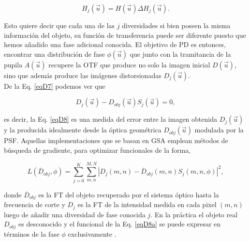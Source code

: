 \begin{equation}
\label{eqD5}
	H_j(\vec{u}) = H(\vec{u})\Delta H_j(\vec{u}).
\end{equation}


Esto quiere decir que cada una de las $j$ diversidades si bien poseen la misma información del objeto, su función de transferencia puede ser diferente puesto que hemos añadido una fase adicional conocida. El objetivo de PD es entonces, encontrar una distribución de fase $\phi (\vec{u})$ que junto con la tramitancia de la pupila $A (\vec{u})$ recupere la OTF que produce no solo la imagen inicial $D(\vec{u})$, sino que además produce las imágenes distorsionadas $D_{j}(\vec{u})$.\\

De la Eq. \ref{eqD7} podemos ver que

\begin{equation}
\label{eqD8}
	D_j(\vec{u}) - D_{obj}(\vec{u}) S_j(\vec{u}) = 0,
\end{equation}

es decir, la Eq. \ref{eqD8} es una medida del error entre la imagen obtenida $D_j(\vec{u})$ y la producida idealmente desde la óptica geométrica $D_{obj}(\vec{u})$ modulada por la PSF. Aquellas implementaciones que se basan en GSA \cite{Paxman1992, Echeverri2015} emplean métodos de búsqueda de gradiente, para optimizar funcionales de la forma,

\begin{equation}
\label{eqD8a}
L(\overline{D}_{obj}, \phi) = \sum\limits_{j=0}^K \sum\limits_{m,n}^{M,N} |D_j(m,n) - \overline{D}_{obj}(m,n) S_j(m,n,\phi)|^2,
\end{equation}

donde $\overline{D}_{obj}$ es la FT del objeto recuperado por el sistema óptico hasta la frecuencia de corte y $D_j$ es la FT de la intensidad medida en cada pixel $(m,n)$ luego de añadir una diversidad de fase conocida $j$. En la práctica el objeto real $D_{obj}$ es desconocido y el funcional de la Eq. \ref{eqD8a} se puede expresar en términos de la fase $\phi$ exclusivamente \cite{Paxman1992, Gonsalves1982}.\\



